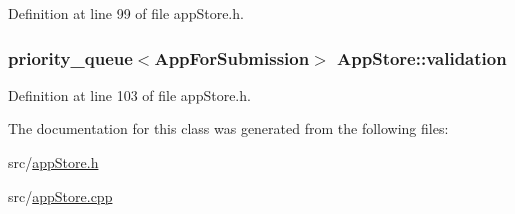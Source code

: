 Definition at line 99 of file app\-Store.\-h.

\hypertarget{class_app_store_a5aac74886d1170f360838aaa8428652b}{
\subsubsection[{validation}]{\setlength{\rightskip}{0pt plus 5cm}priority\-\_\-queue$<${\bf App\-For\-Submission}$>$ App\-Store\-::validation}}\label{class_app_store_a5aac74886d1170f360838aaa8428652b}


Definition at line 103 of file app\-Store.\-h.



The documentation for this class was generated from the following files\-:\begin{DoxyCompactItemize}
\item 
src/\hyperlink{app_store_8h}{app\-Store.\-h}\item 
src/\hyperlink{app_store_8cpp}{app\-Store.\-cpp}\end{DoxyCompactItemize}

